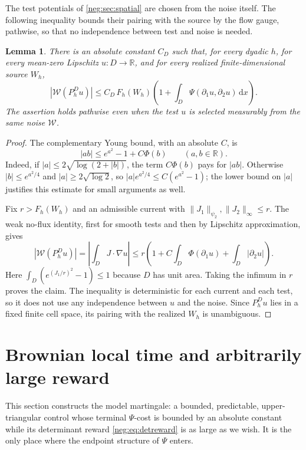 \documentclass[11pt]{article}
\newtheorem{lemma}[lemma]{Lemma}
\theoremstyle{definition}
\theoremstyle{remark}
\numberwithin{equation}{section}
\begin{document}
The test potentials of \cref{neg:sec:spatial} are chosen from the
noise itself. The following inequality bounds their pairing with the
source by the flow gauge, pathwise, so that no independence between
test and noise is needed.

\begin{lemma}\label{neg:lem:dual}
There is an absolute constant $C_D$ such that, for every dyadic $h$,
for every mean-zero Lipschitz $u:D\to\mathbb R$, and for every realized
finite-dimensional source $W_h$,
\begin{equation}\label{neg:eq:dual-bound}
 |\mathcal W(P_h^Du)|
 \le C_D\,F_h(W_h)
   \left(1+\int_D\Psi(\partial_1u,\partial_2u)\,\mathrm dx\right).
\end{equation}
The assertion holds pathwise even when the test $u$ is selected
measurably from the same noise $\mathcal W$.
\end{lemma}
\begin{proof}
The complementary Young bound, with an absolute $C$, is
\begin{equation}\label{neg:eq:Young}
  |ab|\le e^{a^2}-1+C\Phi(b)\qquad (a,b\in\mathbb R).
\end{equation}
Indeed, if $|a|\le2\sqrt{\log(2+|b|)}$, the term
$C\Phi(b)$ pays for $|ab|$. Otherwise $|b|\le e^{a^2/4}$ and
$|a|\ge2\sqrt{\log2}$, so $|a|e^{a^2/4}\le C(e^{a^2}-1)$; the lower
bound on $|a|$ justifies this estimate for small arguments as well.

Fix $r>F_h(W_h)$ and an admissible current with
$\|J_1\|_{\psi_2},\|J_2\|_\infty\le r$. The weak no-flux identity,
first for smooth tests and then by Lipschitz approximation, gives
\[
 |\mathcal W(P_h^Du)|=\left|\int_DJ\cdot\nabla u\right|
 \le r\left(1+C\int_D\Phi(\partial_1u)
                   +\int_D|\partial_2u|\right).
\]
Here $\int_D(e^{(J_1/r)^2}-1)\le1$ because $D$ has unit area.
Taking the infimum in $r$ proves the claim. The inequality is
deterministic for each current and each test, so it does not use any
independence between $u$ and the noise. Since $P_h^Du$ lies in a fixed
finite cell space, its pairing with the realized $W_h$ is unambiguous.
\end{proof}

\section{Brownian local time and arbitrarily large reward}
\label{neg:sec:brownian}

This section constructs the model martingale: a bounded, predictable,
upper-triangular control whose terminal $\Psi$-cost is bounded by an
absolute constant while its determinant reward \eqref{neg:eq:detreward}
is as large as we wish. It is the only place where the endpoint
structure of $\Psi$ enters.
\end{document}
